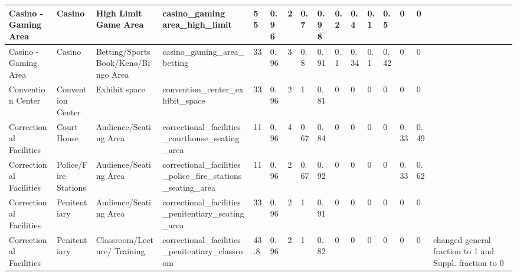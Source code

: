 \begin{center}
\begin{landscape}
\begin{longtable}{|p{0.75in}|p{0.75in}|p{0.75in}|p{0.75in}|p{0.3in}|p{0.3in}|p{0.3in}|p{0.3in}|p{0.3in}|p{0.3in}|p{0.3in}|p{0.3in}|p{0.3in}|p{0.3in}|p{0.3in}|p{0.6in}|}
      Casino - Gaming Area                    & Casino                      & High Limit Game Area                            & casino\_gaming area\_high\_limit                                & 55   & 0.96 & 2  & 0.7    & 0.98  & 0.2   & 0.4   & 0.1  & 0.5  & 0    & 0    &                                                                                       \\ \hline
      Casino - Gaming Area                    & Casino                      & Betting/Sports Book/Keno/Bingo Area       & casino\_gaming\_area\_betting                                   & 33   & 0.96 & 3  & 0.8    & 0.91  & 0.1   & 0.34  & 0.1  & 0.42 & 0    & 0    &                                                                                       \\ \hline
      Convention Center                       & Convention Center           & Exhibit space                                   & convention\_center\_exhibit\_space                              & 33   & 0.96 & 2  & 1      & 0.81  & 0     & 0     & 0    & 0    & 0    & 0    &                                                                                       \\ \hline
      Correctional Facilities                 & Court House                 & Audience/Seating Area                           & correctional\_facilities\_courthouse\_seating\_area             & 11   & 0.96 & 4  & 0.67   & 0.84  & 0     & 0     & 0    & 0    & 0.33 & 0.49 &                                                                                       \\ \hline
      Correctional Facilities                 & Police/Fire Stations        & Audience/Seating Area                           & correctional\_facilities\_police\_fire\_stations\_seating\_area & 11   & 0.96 & 2  & 0.67   & 0.92  & 0     & 0     & 0    & 0    & 0.33 & 0.62 &                                                                                       \\ \hline
      Correctional Facilities                 & Penitentiary                & Audience/Seating Area                           & correctional\_facilities\_penitentiary\_seating\_area           & 33   & 0.96 & 2  & 1      & 0.91  & 0     & 0     & 0    & 0    & 0    & 0    &                                                                                       \\ \hline
      Correctional Facilities                 & Penitentiary                & Classroom/Lecture/ Training                      & correctional\_facilities\_penitentiary\_classroom               & 43.8 & 0.96 & 2  & 1      & 0.82  & 0     & 0     & 0    & 0    & 0    & 0    & changed general fraction to 1 and Suppl. fraction to 0                          \\ \hline

\end{longtable}
\end{landscape}
\end{center}
